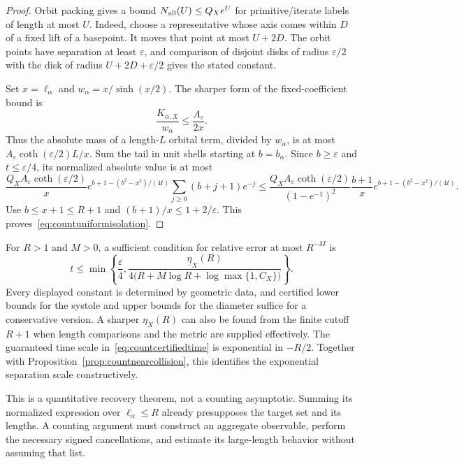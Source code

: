 \documentclass[11pt,a4paper]{article}
\numberwithin{equation}{section}
\theoremstyle{definition}
\theoremstyle{remark}
\begin{document}
\begin{proof}
Orbit packing gives a bound $N_{\rm all}(U)\leq Q_Xe^U$
for primitive/iterate labels of length at most $U$.
Indeed, choose a representative whose axis comes within $D$ of
a fixed lift of a basepoint. It moves that point at most $U+2D$.
The orbit points have separation at least $\varepsilon$, and
comparison of disjoint disks of radius $\varepsilon/2$ with the
disk of radius $U+2D+\varepsilon/2$ gives the stated constant.

Set $x=\ell_\alpha$ and $w_\alpha=x/\sinh(x/2)$.
The sharper form of the fixed-coefficient bound is
\[
 \frac{K_{\alpha,X}}{w_\alpha}
 \leq\frac{A_\varepsilon}{2x}.
\]
Thus the absolute mass of a length-$L$ orbital term, divided by
$w_\alpha$, is at most
$A_\varepsilon\coth(\varepsilon/2)L/x$.
Sum the tail in unit shells starting at $b=b_\alpha$.
Since $b\geq\varepsilon$ and $t\leq\varepsilon/4$, its normalized
absolute value is at most
\[
 \frac{Q_X A_\varepsilon\coth(\varepsilon/2)}{x}
 e^{b+1-(b^2-x^2)/(4t)}
 \sum_{j\geq0}(b+j+1)e^{-j}
 \leq
 \frac{Q_X A_\varepsilon\coth(\varepsilon/2)}{(1-e^{-1})^2}
 \frac{b+1}{x}e^{b+1-(b^2-x^2)/(4t)}.
\]
Use $b\leq x+1\leq R+1$ and $(b+1)/x\leq1+2/\varepsilon$.
This proves~\eqref{eq:countuniformisolation}.
\end{proof}

For $R>1$ and $M>0$, a sufficient condition for relative error
at most $R^{-M}$ is
\begin{equation}
 t\leq\min\left\{\frac\varepsilon4,
 \frac{\underline\eta_X(R)}
      {4\bigl(R+M\log R+\log\max\{1,C_X\}\bigr)}\right\}.
 \label{eq:countcertifiedtime}
\end{equation}
Every displayed constant is determined by geometric data, and
certified lower bounds for the systole and upper bounds for the
diameter suffice for a conservative version. A sharper $\eta_X(R)$
can also be found from the finite cutoff $R+1$ when length
comparisons and the metric are supplied effectively. The guaranteed
time scale in~\eqref{eq:countcertifiedtime} is exponential in $-R/2$.
Together with Proposition~\ref{prop:countnearcollision}, this
identifies the exponential separation scale constructively.

This is a quantitative recovery theorem, not a counting asymptotic.
Summing its normalized expression over $\ell_\alpha\leq R$
already presupposes the target set and its lengths. A counting
argument must construct an aggregate observable, perform the
necessary signed cancellations, and estimate its large-length
behavior without assuming that list.
\end{document}
